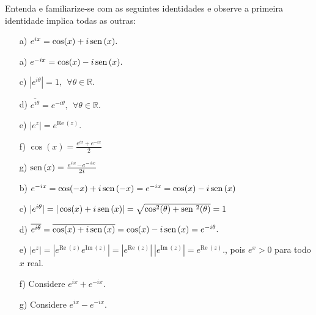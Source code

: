 \begin{exer}\label{familiarize} Entenda e familiarize-se com as seguintes identidades e observe a primeira identidade implica todas as outras:
\begin{itemize}
 \item [a)] $e^{ix}=\cos(x)+i\operatorname{sen}\,(x).$
 \item [a)] $e^{-ix}=\cos(x)-i\operatorname{sen}\,(x).$
 \item [c)] $|e^{i\theta}|=1, ~~ \forall \theta\in\mathbb{R}.$
 \item [d)] $\overline{e^{i\theta}}=e^{-i\theta}, ~~ \forall \theta\in\mathbb{R}.$
 \item [e)] $|e^{z}|=e^{\text{Re}~\!( z)}.$
 \item [f)] $\cos(x)=\frac{e^{ix}+e^{-ix}}{2}$
 \item [g)] $\operatorname{sen}\,(x)=\frac{e^{ix}-e^{-ix}}{2i}$
 \end{itemize}
\end{exer}
\begin{resp}
 \begin{itemize}
 \item [b)] $e^{-ix}=\cos(-x)+i\operatorname{sen}\,(-x)=e^{-ix}=\cos(x)-i\operatorname{sen}\,(x)$
 \item [c)] $|e^{i\theta}|=|\cos(x)+i\operatorname{sen}\,(x)|= \sqrt{\cos^2(\theta)+\operatorname{sen}\,^2(\theta)}=1$
 \item [d)] $\overline{e^{i\theta}}=\overline{\cos(x)+i\operatorname{sen}\,(x)}=\cos(x)-i\operatorname{sen}\,(x)=e^{-i\theta}.$
 \item [e)] $|e^{z}|=|e^{\text{Re}~\!( z)}e^{\text{Im}~\!( z)}|=|e^{\text{Re}~\!( z)}|~|e^{\text{Im}~\!( z)}|=e^{\text{Re}~\!( z)}.$, pois $e^x>0$ para todo $x$ real.
 \item [f)] Considere $e^{ix}+e^{-ix}$.
 \item [g)] Considere $e^{ix}-e^{-ix}$.
 \end{itemize}
\end{resp}


